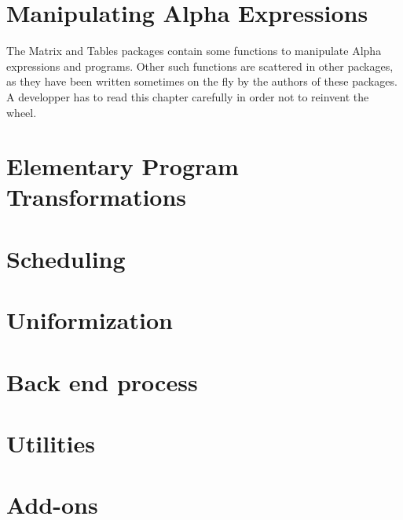 \documentclass[11pt]{report}
\begin{document}
\chapter{Manipulating Alpha Expressions}
\label{manipfunctions}
The Matrix and Tables packages contain some functions to manipulate
Alpha expressions and programs. Other such functions are scattered
in other packages, as they have been written sometimes on the fly
by the authors of these packages. A developper has to read this
chapter carefully in order not to reinvent the wheel.



\chapter{Elementary Program Transformations}
\label{elementaryfunctions}


\chapter{Scheduling}
\label{scheduling}





\chapter{Uniformization}
\label{uniformization}




\chapter{Back end process}
\label{backend}





\chapter{Utilities}
\label{utilities}

\chapter{Add-ons}





























\printindex
\end{document}
